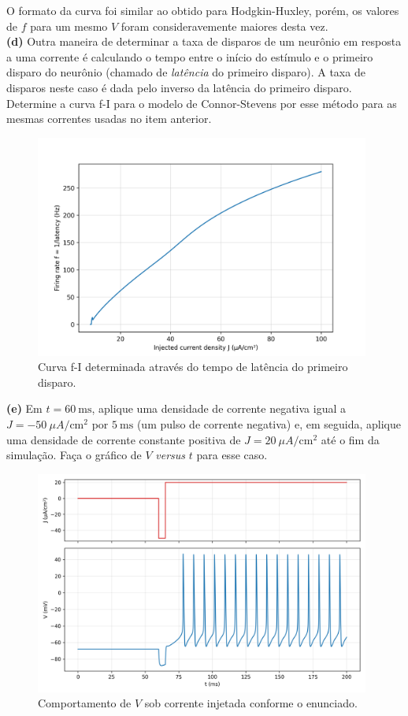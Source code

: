 \documentclass[english,11pt,a4paper]{article}
\begin{document}
	O formato da curva foi similar ao obtido para Hodgkin-Huxley, porém, os valores de $f$ para um mesmo $V$ foram consideravemente maiores desta vez.\\
	
	\noindent \textbf{(d)} Outra maneira de determinar a taxa de disparos de um neurônio em resposta a uma corrente é calculando o tempo entre o início do estímulo e o primeiro disparo do neurônio (chamado de \textit{latência} do primeiro disparo). A taxa de disparos neste caso é dada pelo inverso da latência do primeiro disparo. Determine a curva f-I para o modelo de Connor-Stevens por esse método para as mesmas correntes usadas no item anterior.
	
	\begin{figure}[H]
		\centering
		\includegraphics[width=11cm]{../figures/ex_1d.png}	
		\caption{Curva f-I determinada através do tempo de latência do primeiro disparo.}
	\end{figure}
	
	\noindent \textbf{(e)} Em $t = 60 \ \text{ms}$, aplique uma densidade de corrente negativa igual a $J = -50 \ \mu A/\text{cm}^2$ por $5 \ \text{ms}$ (um pulso de corrente negativa) e, em seguida, aplique uma densidade de corrente constante positiva de $J = 20 \ \mu A/\text{cm}^2$ até o fim da simulação. Faça o gráfico de $V$ \textit{versus} $t$ para esse caso.\\
	
	\begin{figure}[H]
	\centering
	\includegraphics[width=11cm]{../figures/ex_1e.png}	
	\caption{Comportamento de $V$ sob corrente injetada conforme o enunciado.}
	\end{figure}
	
\end{document}
